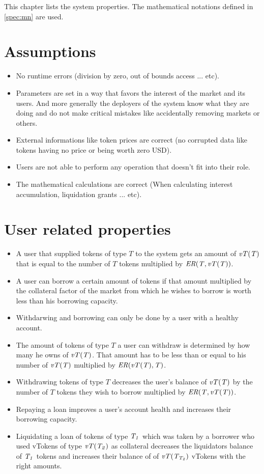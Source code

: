 
This chapter lists the system properties. The mathematical notations defined in \ref{spec:mn} are used.

\section{Assumptions}

\begin{itemize}
  \item No runtime errors (division by zero, out of bounds access ... etc).
  \item Parameters are set in a way that favors the interest of the market and its users. And more generally the deployers of the system know what they are doing and do not make critical mistakes like accidentally removing markets or others.
  \item External informations like token prices are correct (no corrupted data like tokens having no price or being worth zero USD).
  \item Users are not able to perform any operation that doesn't fit into their role.
  \item The mathematical calculations are correct (When calculating interest accumulation, liquidation grants ... etc).
\end{itemize}

\section{User related properties}

\begin{itemize}
  \item A user that supplied tokens of type $T$ to the system gets an amount of $\mathit{vT(T)}$ that is equal to the number of $T$ tokens multiplied by $\mathit{ER(T, \mathit{vT(T)})}$.
  
  \item A user can borrow a certain amount of tokens if that amount multiplied by the collateral factor of the market from which he wishes to borrow is worth less than his borrowing capacity.
  
  \item Withdarwing and borrowing can only be done by a user with a healthy account.
  \item The amount of tokens of type $T$ a user can withdraw is determined by how many he owns of $\mathit{vT(T)}$. That amount has to be less than or equal to his number of $\mathit{vT(T)}$ multiplied by $\mathit{ER(\mathit{vT(T)}, T)}$.
  \item Withdrawing tokens of type $T$ decreases the user's balance of $\mathit{vT(T)}$ by the number of $T$ tokens they wish to borrow multiplied by $\mathit{ER(T, \mathit{vT(T)})}$.
  
  \item Repaying a loan improves a user's account health and increases their borrowing capacity.

  \item Liquidating a loan of tokens of type $\mathit{T_{1}}$ which was taken by a borrower who used vTokens of type $\mathit{vT(\mathit{T_{2}})}$ as collateral decreases the liquidators balance of $\mathit{T_{1}}$ tokens and increases their balance of of $\mathit{vT(\mathit{T_{T_2}})}$ vTokens with the right amounts.
\end{itemize}

